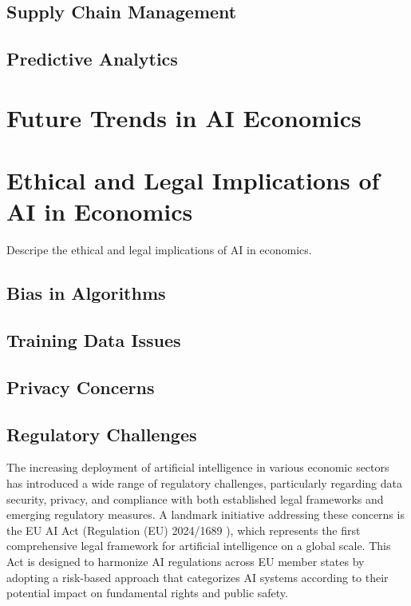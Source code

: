 \subsection{Supply Chain Management}

\subsection{Predictive Analytics}


\section{Future Trends in AI Economics}


\section{Ethical and Legal Implications of AI in Economics}
\label{sec:ethical-and-legal-implications-of-ai-in-economics}

Descripe the ethical and legal implications of AI in economics.

\subsection{Bias in Algorithms}

\subsection{Training Data Issues}

\subsection{Privacy Concerns}

\subsection{Regulatory Challenges}

The increasing deployment of artificial intelligence in various economic sectors has introduced a wide range of regulatory challenges, particularly regarding data security, privacy, and compliance with both established legal frameworks and emerging regulatory measures. A landmark initiative addressing these concerns is the EU AI Act (Regulation (EU) 2024/1689 \cite{EU-AI-Act-text}), which represents the first comprehensive legal framework for artificial intelligence on a global scale. This Act is designed to harmonize AI regulations across EU member states by adopting a risk-based approach that categorizes AI systems according to their potential impact on fundamental rights and public safety.

